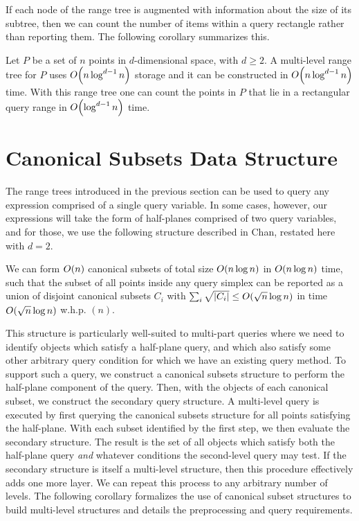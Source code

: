 If each node of the range tree is augmented with information about the size of its subtree, then we can count the number of items within a query rectangle rather than reporting them. The following corollary summarizes this.

\begin{corollary}
\label{cor:rangetree}
Let $P$ be a set of $n$ points in $d$-dimensional space, with $d \geq 2$. A multi-level range tree for $P$ uses $O\!\left(n \log^{d-1}{n}\right)$ storage and it can be constructed in $O\!\left(n \log^{d-1}{n}\right)$ time. With this range tree one can count the points in $P$ that lie in a rectangular query range in $O\!\left(\log^{d-1}{n}\right)$ time.
\end{corollary}


\section{Canonical Subsets Data Structure}
\label{:prelim:chan}

The range trees introduced in the previous section can be used to query any expression comprised of a single query variable.  In some cases, however, our expressions will take the form of half-planes comprised of two query variables, and for those, we use the following structure described in Chan\cite{chan2012}, restated here with $d=2$.

\begin{theorem}
\label{th:chan}
We can form $O\!\left(n\right)$ canonical subsets of total size $O\!\left(n \log{n}\right)$ in $O\!\left(n \log{n}\right)$ time, such that the subset of all points inside any query simplex can be reported as a union of disjoint canonical subsets $C_i$ with $\sum_i{\sqrt{|C_i|}} \leq O\!\left(\sqrt{n}\log{n}\right)$ in time $O\!\left(\sqrt{n}\log{n}\right)$ w.h.p. $(n)$.
\end{theorem}

This structure is particularly well-suited to multi-part queries where we need to identify objects which satisfy a half-plane query, and which also satisfy some other arbitrary query condition for which we have an existing query method.
To support such a query, we construct a canonical subsets structure to perform the half-plane component of the query. 
Then, with the objects of each canonical subset, we construct the secondary query structure.
A multi-level query is executed by first querying the canonical subsets structure for all points satisfying the half-plane.
With each subset identified by the first step, we then evaluate the secondary structure.
The result is the set of all objects which satisfy both the half-plane query \emph{and} whatever conditions the second-level query may test.
If the secondary structure is itself a multi-level structure, then this procedure effectively adds one more layer.
We can repeat this process to any arbitrary number of levels.
The following corollary formalizes the use of canonical subset structures to build multi-level structures and details the preprocessing and query requirements.



